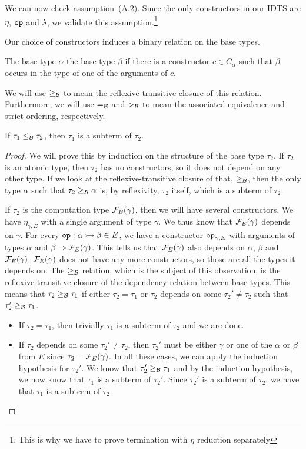 We can now check assumption~(A.2). Since the only constructors in our IDTS
are $\eta$, $\mathtt{op}$ and $\lambda$, we validate this
assumption.\footnote{This is why we have to prove termination with $\eta$
  reduction separately}

Our choice of constructors induces a binary relation on the base types.

\begin{definition}
  The base type $\alpha$  the base type $\beta$ if there
  is a constructor $c \in C_\alpha$ such that $\beta$ occurs in the type of
  one of the arguments of $c$.
  
  We will use $\ge_{\mathcal{B}}$ to mean the reflexive-transitive closure of this
  relation. Furthermore, we will use $=_{\mathcal{B}}$ and $>_{\mathcal{B}}$ to mean the
  associated equivalence and strict ordering, respectively.
\end{definition}

\begin{observation}
  If $\tau_1 \le_{\mathcal{B}} \tau_2$, then $\tau_1$ is a subterm of $\tau_2$.
\end{observation}
\begin{proof}
  We will prove this by induction on the structure of the base type
  $\tau_2$. If $\tau_2$ is an atomic type, then $\tau_2$ has no
  constructors, so it does not depend on any other type. If we look at the
  reflexive-transitive closure of that, $\ge_{\mathcal{B}}$, then the only type
  $\alpha$ such that $\tau_2 \ge_{\mathcal{B}} \alpha$ is, by reflexivity, $\tau_2$
  itself, which is a subterm of $\tau_2$.
  
  If $\tau_2$ is the computation type $\mathcal{F}_E(\gamma)$, then we will have
  several constructors. We have $\eta_{\gamma,E}$ with a single argument of
  type $\gamma$. We thus know that $\mathcal{F}_E(\gamma)$ depends on $\gamma$. For
  every $\mathtt{op} : \alpha \rightarrowtail \beta \in E$, we have a constructor
  $\mathtt{op}_{\gamma,E}$ with arguments of types $\alpha$ and
  $\beta \Rightarrow \mathcal{F}_E(\gamma)$. This tells us that $\mathcal{F}_E(\gamma)$ also
  depends on $\alpha$, $\beta$ and $\mathcal{F}_E(\gamma)$. $\mathcal{F}_E(\gamma)$ does
  not have any more constructors, so those are all the types it depends on.
  The $\ge_{\mathcal{B}}$ relation, which is the subject of this observation, is the
  reflexive-transitive closure of the dependency relation between base
  types. This means that $\tau_2 \ge_{\mathcal{B}} \tau_1$ if either
  $\tau_2 = \tau_1$ or $\tau_2$ depends on some $\tau_2' \neq \tau_2$ such
  that $\tau_2' \ge_{\mathcal{B}} \tau_1$.
  \begin{itemize}
  \item If $\tau_2 = \tau_1$, then trivially $\tau_1$ is a subterm of
    $\tau_2$ and we are done.
  \item If $\tau_2$ depends on some $\tau_2' \neq \tau_2$, then $\tau_2'$
    must be either $\gamma$ or one of the $\alpha$ or $\beta$ from $E$
    since $\tau_2 = \mathcal{F}_E(\gamma)$. In all these cases, we can apply the
    induction hypothesis for $\tau_2'$. We know that
    $\tau_2' \ge_{\mathcal{B}} \tau_1$ and by the induction hypothesis, we now know
    that $\tau_1$ is a subterm of $\tau_2'$. Since $\tau_2'$ is a subterm
    of $\tau_2$, we have that $\tau_1$ is a subterm of $\tau_2$.
  \end{itemize}
\end{proof}

